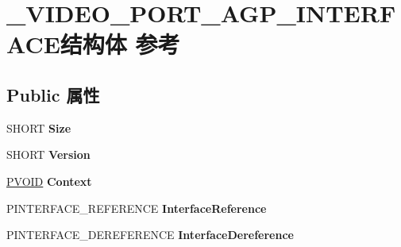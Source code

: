 \hypertarget{struct___v_i_d_e_o___p_o_r_t___a_g_p___i_n_t_e_r_f_a_c_e}{}\section{\+\_\+\+V\+I\+D\+E\+O\+\_\+\+P\+O\+R\+T\+\_\+\+A\+G\+P\+\_\+\+I\+N\+T\+E\+R\+F\+A\+C\+E结构体 参考}
\label{struct___v_i_d_e_o___p_o_r_t___a_g_p___i_n_t_e_r_f_a_c_e}
\subsection*{Public 属性}
\begin{DoxyCompactItemize}
\item 
\mbox{\label{struct___v_i_d_e_o___p_o_r_t___a_g_p___i_n_t_e_r_f_a_c_e_a58429386c35119c8920c07d1d27088d8}} 
S\+H\+O\+RT {\bfseries Size}
\item 
\mbox{\label{struct___v_i_d_e_o___p_o_r_t___a_g_p___i_n_t_e_r_f_a_c_e_a7d6171d9dfab162c2ada860b43533591}} 
S\+H\+O\+RT {\bfseries Version}
\item 
\mbox{\label{struct___v_i_d_e_o___p_o_r_t___a_g_p___i_n_t_e_r_f_a_c_e_a5ecdcaf5aa8936aed6f37b5a2edd942d}} 
\hyperlink{interfacevoid}{P\+V\+O\+ID} {\bfseries Context}
\item 
\mbox{\label{struct___v_i_d_e_o___p_o_r_t___a_g_p___i_n_t_e_r_f_a_c_e_a2eb5e62edbc2f9d048178c1951a7673d}} 
P\+I\+N\+T\+E\+R\+F\+A\+C\+E\+\_\+\+R\+E\+F\+E\+R\+E\+N\+CE {\bfseries Interface\+Reference}
\item 
\mbox{\label{struct___v_i_d_e_o___p_o_r_t___a_g_p___i_n_t_e_r_f_a_c_e_a3bfbeff4f0ecbc4e6c1cf57dab98c818}} 
P\+I\+N\+T\+E\+R\+F\+A\+C\+E\+\_\+\+D\+E\+R\+E\+F\+E\+R\+E\+N\+CE {\bfseries Interface\+Dereference}
\item 
\mbox{\label{struct___v_i_d_e_o___p_o_r_t___a_g_p___i_n_t_e_r_f_a_c_e_a0ed9212c4f52a6cbcac22dc930e7964f}} 

\end{DoxyCompactItemize}

